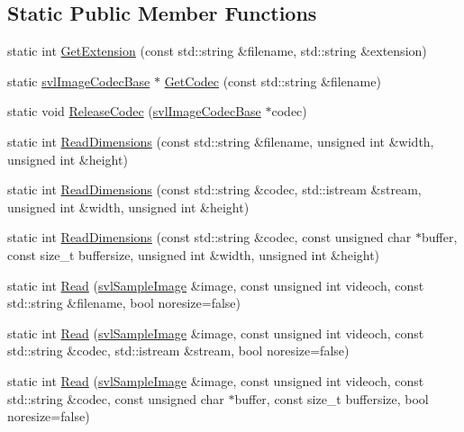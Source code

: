 \subsection*{Static Public Member Functions}
\begin{DoxyCompactItemize}
\item 
static int \hyperlink{classsvl_image_i_o_abb7a293f4b39b2302ccba01657e4eec0}{Get\+Extension} (const std\+::string \&filename, std\+::string \&extension)
\item 
static \hyperlink{classsvl_image_codec_base}{svl\+Image\+Codec\+Base} $\ast$ \hyperlink{classsvl_image_i_o_ae36e26b8aa46650cc3ea3ca0655d70b7}{Get\+Codec} (const std\+::string \&filename)
\item 
static void \hyperlink{classsvl_image_i_o_a33543ab73efe1e2e330a7402a826b675}{Release\+Codec} (\hyperlink{classsvl_image_codec_base}{svl\+Image\+Codec\+Base} $\ast$codec)
\item 
static int \hyperlink{classsvl_image_i_o_a9437d547489fe7a01f820fbdaa377431}{Read\+Dimensions} (const std\+::string \&filename, unsigned int \&width, unsigned int \&height)
\item 
static int \hyperlink{classsvl_image_i_o_a6341e68885499d632e34f89a8eeab21c}{Read\+Dimensions} (const std\+::string \&codec, std\+::istream \&stream, unsigned int \&width, unsigned int \&height)
\item 
static int \hyperlink{classsvl_image_i_o_ae4e0217577a16c269f22e91254964275}{Read\+Dimensions} (const std\+::string \&codec, const unsigned char $\ast$buffer, const size\+\_\+t buffersize, unsigned int \&width, unsigned int \&height)
\item 
static int \hyperlink{classsvl_image_i_o_a7b32537e65e950afa2c98779f6ea3aaa}{Read} (\hyperlink{classsvl_sample_image}{svl\+Sample\+Image} \&image, const unsigned int videoch, const std\+::string \&filename, bool noresize=false)
\item 
static int \hyperlink{classsvl_image_i_o_a19386cfa5b3627a925bacc2f1a437013}{Read} (\hyperlink{classsvl_sample_image}{svl\+Sample\+Image} \&image, const unsigned int videoch, const std\+::string \&codec, std\+::istream \&stream, bool noresize=false)
\item 
static int \hyperlink{classsvl_image_i_o_a1c4689a1c91acb189a320cf5fa93cade}{Read} (\hyperlink{classsvl_sample_image}{svl\+Sample\+Image} \&image, const unsigned int videoch, const std\+::string \&codec, const unsigned char $\ast$buffer, const size\+\_\+t buffersize, bool noresize=false)
\item 

\end{DoxyCompactItemize}
